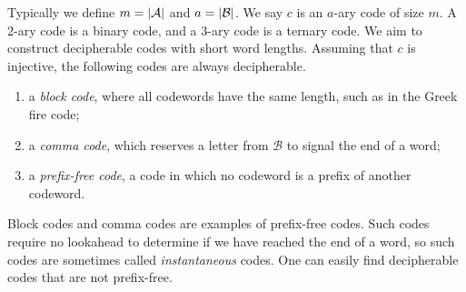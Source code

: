 Typically we define \( m = \abs{\mathcal A} \) and \( a = \abs{\mathcal B} \).
We say \( c \) is an \( a \)-ary code of size \( m \).
A 2-ary code is a binary code, and a 3-ary code is a ternary code.
We aim to construct decipherable codes with short word lengths.
Assuming that \( c \) is injective, the following codes are always decipherable.
\begin{enumerate}
    \item a \emph{block code}, where all codewords have the same length, such as in the Greek fire code;
    \item a \emph{comma code}, which reserves a letter from \( \mathcal B \) to signal the end of a word;
    \item a \emph{prefix-free code}, a code in which no codeword is a prefix of another codeword.
\end{enumerate}
Block codes and comma codes are examples of prefix-free codes.
Such codes require no lookahead to determine if we have reached the end of a word, so such codes are sometimes called \emph{instantaneous} codes.
One can easily find decipherable codes that are not prefix-free.

